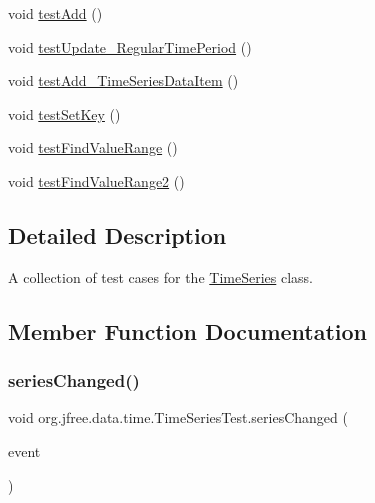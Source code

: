 \begin{DoxyCompactItemize}
void \mbox{\hyperlink{classorg_1_1jfree_1_1data_1_1time_1_1_time_series_test_aa67e1286fc6d005922148672e5875618}{test\+Add}} ()
\item 
void \mbox{\hyperlink{classorg_1_1jfree_1_1data_1_1time_1_1_time_series_test_a94f3a27a735abc3f63f78a0f83d488ef}{test\+Update\+\_\+\+Regular\+Time\+Period}} ()
\item 
void \mbox{\hyperlink{classorg_1_1jfree_1_1data_1_1time_1_1_time_series_test_a88e08a6f9c7886e50bab0182e92751df}{test\+Add\+\_\+\+Time\+Series\+Data\+Item}} ()
\item 
void \mbox{\hyperlink{classorg_1_1jfree_1_1data_1_1time_1_1_time_series_test_a984f4bb465fb03fa8cb5f20d621d472e}{test\+Set\+Key}} ()
\item 
void \mbox{\hyperlink{classorg_1_1jfree_1_1data_1_1time_1_1_time_series_test_a14509c160217a31b6d73e9e7a1461c96}{test\+Find\+Value\+Range}} ()
\item 
void \mbox{\hyperlink{classorg_1_1jfree_1_1data_1_1time_1_1_time_series_test_a9e6759cc98aaf12dd749c7aef2142b2a}{test\+Find\+Value\+Range2}} ()
\end{DoxyCompactItemize}


\subsection{Detailed Description}
A collection of test cases for the \mbox{\hyperlink{classorg_1_1jfree_1_1data_1_1time_1_1_time_series}{Time\+Series}} class. 

\subsection{Member Function Documentation}
\mbox{\label{classorg_1_1jfree_1_1data_1_1time_1_1_time_series_test_a57d6e460a96c8212fed888ae1f2d22cd}} 
\subsubsection{\texorpdfstring{series\+Changed()}{seriesChanged()}}
{\footnotesize\ttfamily void org.\+jfree.\+data.\+time.\+Time\+Series\+Test.\+series\+Changed (\begin{DoxyParamCaption}\item[{\mbox{\hyperlink{classorg_1_1jfree_1_1data_1_1general_1_1_series_change_event}{Series\+Change\+Event}}}]{event }\end{DoxyParamCaption})}

